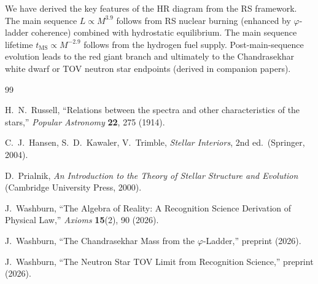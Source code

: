 \documentclass[12pt,a4paper]{article}
\theoremstyle{definition}
\theoremstyle{remark}
\begin{document}
We have derived the key features of the HR diagram from the RS framework.
The main sequence $L \propto M^{3.9}$ follows from RS nuclear burning
(enhanced by $\varphi$-ladder coherence) combined with hydrostatic
equilibrium.  The main sequence lifetime $t_\mathrm{MS} \propto M^{-2.9}$
follows from the hydrogen fuel supply.  Post-main-sequence evolution
leads to the red giant branch and ultimately to the Chandrasekhar
white dwarf or TOV neutron star endpoints (derived in companion papers).

\begin{thebibliography}{99}

H.~N.~Russell, ``Relations between the spectra and other characteristics
of the stars,'' \textit{Popular Astronomy} \textbf{22}, 275 (1914).

C.~J.~Hansen, S.~D.~Kawaler, V.~Trimble, \textit{Stellar Interiors},
2nd ed.\ (Springer, 2004).

D.~Prialnik, \textit{An Introduction to the Theory of Stellar Structure
and Evolution} (Cambridge University Press, 2000).

J.~Washburn, ``The Algebra of Reality: A Recognition Science Derivation
of Physical Law,'' \textit{Axioms} \textbf{15}(2), 90 (2026).

J.~Washburn, ``The Chandrasekhar Mass from the $\varphi$-Ladder,''
preprint (2026).

J.~Washburn, ``The Neutron Star TOV Limit from Recognition Science,''
preprint (2026).

\end{thebibliography}
\end{document}
